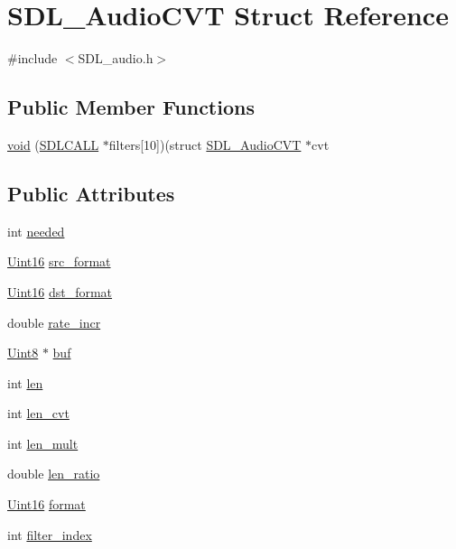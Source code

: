 \hypertarget{struct_s_d_l___audio_c_v_t}{}\section{S\+D\+L\+\_\+\+Audio\+C\+V\+T Struct Reference}
\label{struct_s_d_l___audio_c_v_t}


{\ttfamily \#include $<$S\+D\+L\+\_\+audio.\+h$>$}

\subsection*{Public Member Functions}
\begin{DoxyCompactItemize}
\item 
\hyperlink{struct_s_d_l___audio_c_v_t_a289a571421d05e416dd585c6f890a75b}{void} (\hyperlink{begin__code_8h_a81faf4ba0455dc75f2e0507eddb79401}{S\+D\+L\+C\+A\+L\+L} $\ast$filters\mbox{[}10\mbox{]})(struct \hyperlink{struct_s_d_l___audio_c_v_t}{S\+D\+L\+\_\+\+Audio\+C\+V\+T} $\ast$cvt
\end{DoxyCompactItemize}
\subsection*{Public Attributes}
\begin{DoxyCompactItemize}
\item 
int \hyperlink{struct_s_d_l___audio_c_v_t_ac600a035a48df05e14d3712fd6953ad4}{needed}
\item 
\hyperlink{_s_d_l__stdinc_8h_a31fcc0a076c9068668173ee26d33e42b}{Uint16} \hyperlink{struct_s_d_l___audio_c_v_t_a06215f053474c02d9292b6c317af435c}{src\+\_\+format}
\item 
\hyperlink{_s_d_l__stdinc_8h_a31fcc0a076c9068668173ee26d33e42b}{Uint16} \hyperlink{struct_s_d_l___audio_c_v_t_a2388a295604af1169651568742de928d}{dst\+\_\+format}
\item 
double \hyperlink{struct_s_d_l___audio_c_v_t_ad886122c23a6673073baace31bff3b6c}{rate\+\_\+incr}
\item 
\hyperlink{_s_d_l__stdinc_8h_a2944638813a090aa23e62f4da842c3e2}{Uint8} $\ast$ \hyperlink{struct_s_d_l___audio_c_v_t_a080db27b929efa983c5161360ffce310}{buf}
\item 
int \hyperlink{struct_s_d_l___audio_c_v_t_aeaeb8c5a63c3ab96471fbfdf412c78ff}{len}
\item 
int \hyperlink{struct_s_d_l___audio_c_v_t_a5c60163f34d1947e5b166c23aba9879d}{len\+\_\+cvt}
\item 
int \hyperlink{struct_s_d_l___audio_c_v_t_ac9662d47cf2348b82b27b151150116b0}{len\+\_\+mult}
\item 
double \hyperlink{struct_s_d_l___audio_c_v_t_a5628ff5ccf711de9d77c0a4a9f57d2f0}{len\+\_\+ratio}
\item 
\hyperlink{_s_d_l__stdinc_8h_a31fcc0a076c9068668173ee26d33e42b}{Uint16} \hyperlink{struct_s_d_l___audio_c_v_t_a020b6e1c01089169921ddb0c1e7f08d2}{format}
\item 
int \hyperlink{struct_s_d_l___audio_c_v_t_a35093b3ad3331c17416c593a76012b63}{filter\+\_\+index}
\end{DoxyCompactItemize}


